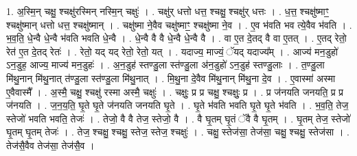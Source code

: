 \documentclass[17pt]{extarticle}
\begin{document}
1. अ॒स्मि॒न् चक्षु॒ श्चक्षु॑रस्मिन् नस्मि॒न् चक्षुः॑ । . चक्षु॑र् धत्तो धत्त॒ श्चक्षु॒ श्चक्षु॑र् धत्तः । . ध॒त्त॒ श्चक्षु॑ष्माꣳ॒॒ श्चक्षु॑ष्मान् धत्तो धत्त॒ श्चक्षु॑ष्मान् । . चक्षु॑ष्मा ने॒वैव चक्षु॑ष्माꣳ॒॒ श्चक्षु॑ष्मा ने॒व । . ए॒व भ॑वति भव त्ये॒वैव भ॑वति । . भ॒व॒ति॒ धे॒न्वै धे॒न्वै भ॑वति भवति धे॒न्वै । . धे॒न्वै वै वै धे॒न्वै धे॒न्वै वै । . वा ए॒त दे॒तद् वै वा ए॒तत् । . ए॒तद् रेतो॒ रेत॑ ए॒त दे॒तद् रेतः॑ । . रेतो॒ यद् यद् रेतो॒ रेतो॒ यत् । . यदाज्य॒ माज्यं॒ ॅयद् यदाज्य᳚म् । . आज्य॑ मन॒डुहो॑ ऽन॒डुह॒ आज्य॒ माज्य॑ मन॒डुहः॑ । . अ॒न॒डुह॑ स्तण्डु॒ला स्त॑ण्डु॒ला अ॑न॒डुहो॑ ऽन॒डुह॑ स्तण्डु॒लाः । . त॒ण्डु॒ला मि॑थु॒नान् मि॑थु॒नात् त॑ण्डु॒ला स्त॑ण्डु॒ला मि॑थु॒नात् । . मि॒थु॒ना दे॒वैव मि॑थु॒नान् मि॑थु॒ना दे॒व । . ए॒वास्मा॑ अस्मा ए॒वैवास्मै᳚ । . अ॒स्मै॒ चक्षु॒ श्चक्षु॑ रस्मा अस्मै॒ चक्षुः॑ । . चक्षुः॒ प्र प्र चक्षु॒ श्चक्षुः॒ प्र । . प्र ज॑नयति जनयति॒ प्र प्र ज॑नयति । . ज॒न॒य॒ति॒ घृ॒ते घृ॒ते ज॑नयति जनयति घृ॒ते । . घृ॒ते भ॑वति भवति घृ॒ते घृ॒ते भ॑वति । . भ॒व॒ति॒ तेज॒ स्तेजो॑ भवति भवति॒ तेजः॑ । . तेजो॒ वै वै तेज॒ स्तेजो॒ वै । . वै घृ॒तम् घृ॒तं ॅवै वै घृ॒तम् । . घृ॒तम् तेज॒ स्तेजो॑ घृ॒तम् घृ॒तम् तेजः॑ । . तेज॒ श्चक्षु॒ श्चक्षु॒ स्तेज॒ स्तेज॒ श्चक्षुः॑ । . चक्षु॒ स्तेज॑सा॒ तेज॑सा॒ चक्षु॒ श्चक्षु॒ स्तेज॑सा । . तेज॑सै॒वैव तेज॑सा॒ तेज॑सै॒व । \newline
\end{document}

